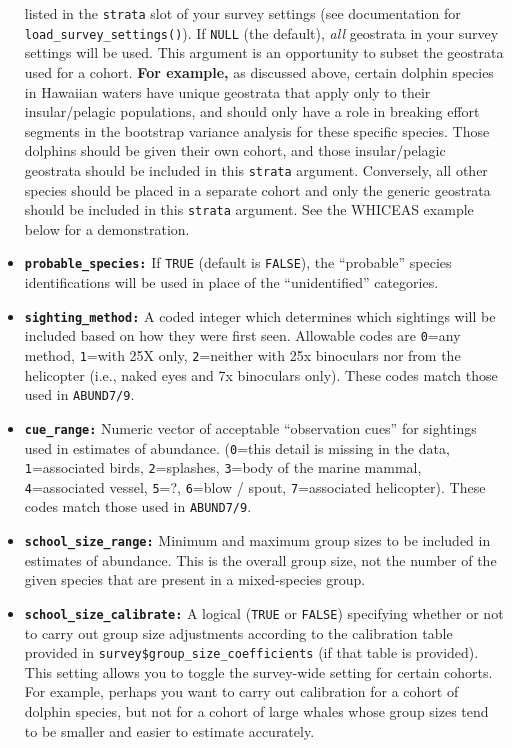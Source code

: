 \documentclass[
]{book}
\begin{document}
\begin{itemize}
  listed in the \texttt{strata} slot of your survey settings (see documentation for \texttt{load\_survey\_settings()}). If \texttt{NULL} (the default), \emph{all} geostrata in your survey settings will be used. This argument is an opportunity to subset the geostrata used for a cohort. \textbf{For example,} as discussed above, certain dolphin species in Hawaiian waters have unique geostrata that apply only to their insular/pelagic populations, and should only have a role in breaking effort segments in the bootstrap variance analysis for these specific species. Those dolphins should be given their own cohort, and those insular/pelagic geostrata should be included in this \texttt{strata} argument. Conversely, all other species should be placed in a separate cohort and only the generic geostrata should be included in this \texttt{strata} argument. See the WHICEAS example below for a demonstration.
\item
  \textbf{\texttt{probable\_species:}} If \texttt{TRUE} (default is \texttt{FALSE}), the ``probable'' species identifications will be used in place of the ``unidentified'' categories.
\item
  \textbf{\texttt{sighting\_method:}} A coded integer which determines which sightings will be included based on how they were first seen. Allowable codes are \texttt{0}=any method, \texttt{1}=with 25X only, \texttt{2}=neither with 25x binoculars nor from the helicopter (i.e., naked eyes and 7x binoculars only). These codes match those used in \texttt{ABUND7/9}.
\item
  \textbf{\texttt{cue\_range:}} Numeric vector of acceptable ``observation cues'' for sightings used in estimates of abundance. (\texttt{0}=this detail is missing in the data, \texttt{1}=associated birds, \texttt{2}=splashes, \texttt{3}=body of the marine mammal, \texttt{4}=associated vessel, \texttt{5}=?, \texttt{6}=blow / spout, \texttt{7}=associated helicopter). These codes match those used in \texttt{ABUND7/9}.
\item
  \textbf{\texttt{school\_size\_range:}} Minimum and maximum group sizes to be included in estimates of abundance. This is the overall group size, not the number of the given species that are present in a mixed-species group.
\item
  \textbf{\texttt{school\_size\_calibrate:}} A logical (\texttt{TRUE} or \texttt{FALSE}) specifying whether or not to carry out group size adjustments according to the calibration table provided in \texttt{survey\$group\_size\_coefficients} (if that table is provided). This setting allows you to toggle the survey-wide setting for certain cohorts. For example, perhaps you want to carry out calibration for a cohort of dolphin species, but not for a cohort of large whales whose group sizes tend to be smaller and easier to estimate accurately.

\end{itemize}
\end{document}
